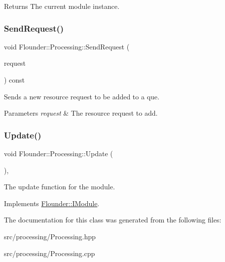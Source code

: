 \begin{DoxyReturn}{Returns}
The current module instance. 
\end{DoxyReturn}
\mbox{\label{class_flounder_1_1_processing_a4c348c809e825456358f0eb22415396a}} 
\subsubsection{\texorpdfstring{Send\+Request()}{SendRequest()}}
{\footnotesize\ttfamily void Flounder\+::\+Processing\+::\+Send\+Request (\begin{DoxyParamCaption}\item[{\hyperlink{class_flounder_1_1_i_request}{I\+Request} $\ast$}]{request }\end{DoxyParamCaption}) const}



Sends a new resource request to be added to a que. 


\begin{DoxyParams}{Parameters}
{\em request} & The resource request to add. \\
\hline
\end{DoxyParams}
\mbox{\label{class_flounder_1_1_processing_a0527f549eb7ac350eb91b6851403784a}} 
\subsubsection{\texorpdfstring{Update()}{Update()}}
{\footnotesize\ttfamily void Flounder\+::\+Processing\+::\+Update (\begin{DoxyParamCaption}{ }\end{DoxyParamCaption})\hspace{0.3cm}{\ttfamily [override]}, {\ttfamily [virtual]}}



The update function for the module. 



Implements \hyperlink{class_flounder_1_1_i_module_a1812bb03a6990e4698a10c043fa25fde}{Flounder\+::\+I\+Module}.



The documentation for this class was generated from the following files\+:\begin{DoxyCompactItemize}
\item 
src/processing/Processing.\+hpp\item 
src/processing/Processing.\+cpp\end{DoxyCompactItemize}
